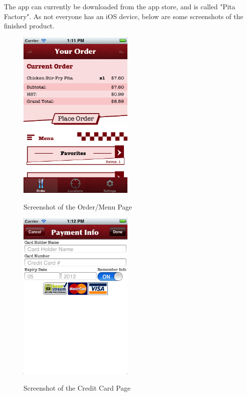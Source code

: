 \documentclass[se]{uw-wkrpt}
\begin{document}
The app can currently be downloaded from the app store, and is called "Pita Factory". As
not everyone has an iOS device, below are some screenshots of the finished product.

\begin{figure}[h!]
  \caption{Screenshot of the Order/Menu Page}
  \centering
    \includegraphics[width=0.5\textwidth]{orderMenuPage}
  \label{fig:Menu Page}
\end{figure}

\begin{figure}[h!]
  \caption{Screenshot of the Credit Card Page}
  \centering
    \includegraphics[width=0.5\textwidth]{creditCardPage}
  \label{fig:Credit Card Page}
\end{figure}
\end{document}
